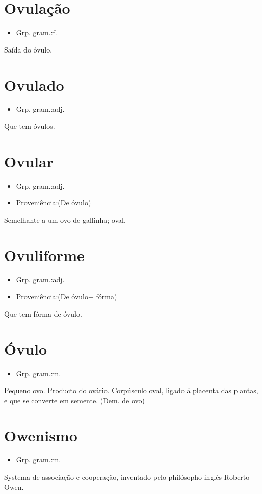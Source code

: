 \section{Ovulação}
\begin{itemize}
\item {Grp. gram.:f.}
\end{itemize}
Saída do óvulo.
\section{Ovulado}
\begin{itemize}
\item {Grp. gram.:adj.}
\end{itemize}
Que tem óvulos.
\section{Ovular}
\begin{itemize}
\item {Grp. gram.:adj.}
\end{itemize}
\begin{itemize}
\item {Proveniência:(De \textunderscore óvulo\textunderscore )}
\end{itemize}
Semelhante a um ovo de gallinha; oval.
\section{Ovuliforme}
\begin{itemize}
\item {Grp. gram.:adj.}
\end{itemize}
\begin{itemize}
\item {Proveniência:(De \textunderscore óvulo\textunderscore  + \textunderscore fórma\textunderscore )}
\end{itemize}
Que tem fórma de óvulo.
\section{Óvulo}
\begin{itemize}
\item {Grp. gram.:m.}
\end{itemize}
Pequeno ovo.
Producto do ovário.
Corpúsculo oval, ligado á placenta das plantas, e que se converte em semente.
(Dem. de \textunderscore ovo\textunderscore )
\section{Owenismo}
\begin{itemize}
\item {Grp. gram.:m.}
\end{itemize}
Systema de associação e cooperação, inventado pelo philósopho inglês Roberto Owen.
